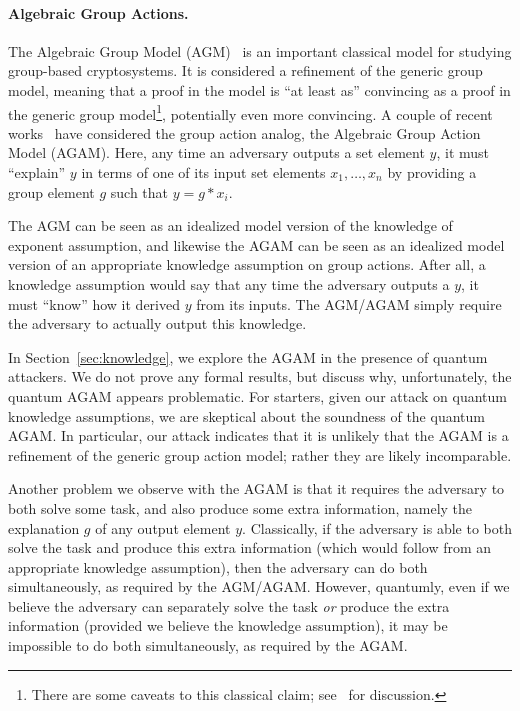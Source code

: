 \documentclass{article}\usepackage[a4paper,margin=20mm]{geometry}
\numberwithin{theorem}{section}
\numberwithin{equation}{section}
\begin{document}
\paragraph{Algebraic Group Actions.} The Algebraic Group Model (AGM)~\cite{C:FucKilLos18} is an important classical model for studying group-based cryptosystems. It is considered a refinement of the generic group model, meaning that a proof in the model is ``at least as'' convincing as a proof in the generic group model\footnote{There are some caveats to this classical claim; see~\cite{C:Zhandry22b} for discussion.}, potentially even more convincing. A couple of recent works~\cite{PKC:DHKKLR23,EPRINT:OrsZan23} have considered the group action analog, the Algebraic Group Action Model (AGAM). Here, any time an adversary outputs a set element $y$, it must ``explain'' $y$ in terms of one of its input set elements $x_1,\dots,x_n$ by providing a group element $g$ such that $y=g*x_i$.

The AGM can be seen as an idealized model version of the knowledge of exponent assumption, and likewise the AGAM can be seen as an idealized model version of an appropriate knowledge assumption on group actions. After all, a knowledge assumption would say that any time the adversary outputs a $y$, it must ``know'' how it derived $y$ from its inputs. The AGM/AGAM simply require the adversary to actually output this knowledge.

In Section~\ref{sec:knowledge}, we explore the AGAM in the presence of quantum attackers. We do not prove any formal results, but discuss why, unfortunately, the quantum AGAM appears problematic. For starters, given our attack on quantum knowledge assumptions, we are skeptical about the soundness of the quantum AGAM. In particular, our attack indicates that it is unlikely that the AGAM is a refinement of the generic group action model; rather they are likely incomparable.

Another problem we observe with the AGAM is that it requires the adversary to both solve some task, and also produce some extra information, namely the explanation $g$ of any output element $y$. Classically, if the adversary is able to both solve the task and produce this extra information (which would follow from an appropriate knowledge assumption), then the adversary can do both simultaneously, as required by the AGM/AGAM. However, quantumly, even if we believe the adversary can separately solve the task \emph{or} produce the extra information (provided we believe the knowledge assumption), it may be impossible to do both simultaneously, as required by the AGAM.
\end{document}
